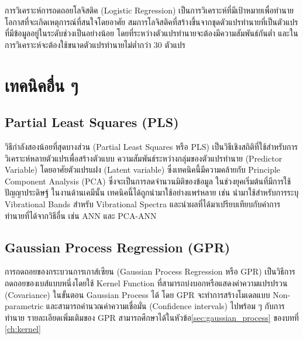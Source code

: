 การวิเคราะห์การถดถอยโลจิสติค (Logistic Regression) เป็นการวิเคราะห์ที่มีเป้าหมายเพื่อทำนายโอกาสที่จะเกิดเหตุการณ์ที่สนใจโดยอาศัย%
สมการโลจิสติคที่สร้างขึ้นจากชุดตัวแปรทำนายที่เป็นตัวแปรที่มีข้อมูลอยู่ในระดับช่วงเป็นอย่างน้อย โดยที่ระหว่างตัวแปรทำนายจะต้องมีความสัมพันธ์กันต่ำ 
และในการวิเคราะห์จะต้องใช้ขนาดตัวแปรทำนายไม่ต่ำกว่า 30 ตัวแปร

\section{เทคนิคอื่น ๆ}

\subsection{Partial Least Squares (PLS)}
\label{sec:pls}

วิธีกำลังสองน้อยที่สุดบางส่วน (Partial Least Squares หรือ PLS) เป็นวิธีเชิงสถิติที่ใช้สำหรับการวิเคราะห์หลายตัวแปรเพื่อสร้างตัวแบบ%
ความสัมพันธ์ระหว่างกลุ่มของตัวแปรทำนาย (Predictor Variable) โดยอาศัยตัวแปรแฝง (Latent variable) ซึ่งเทคนิคนี้มีความคล้ายกับ 
Principle Component Analysis (PCA) ซึ่งจะเป็นการลดจำนวนมิติของข้อมูล\autocite{wold1984} ในช่วงยุคเริ่มต้นที่มีการใช้ปัญญาประดิษฐ์%
ในงานด้านเคมีนั้น เทคนิคนี้ได้ถูกนำมาใช้อย่างแพร่หลาย เช่น นำมาใช้สำหรับการระบุ Vibrational Bands สำหรับ Vibrational Spectra 
และนำผลที่ได้มาเปรียบเทียบกับค่าการทำนายที่ได้จากวิธีอื่น เช่น ANN และ PCA-ANN

\subsection{Gaussian Process Regression (GPR)}
\label{sec:gpr}

การถดถอยของกระบวนการเกาส์เซียน (Gaussian Process Regression หรือ GPR) เป็นวิธีการถดถอยของเบส์แบบหนึ่งโดยใช้ Kernel Function 
ที่สามารถบ่งบอกหรือแสดงค่าความแปรปรวน (Covariance) ในขั้นตอน Gaussian Process ได้\autocite{rasmussen2005} โดย GPR 
จะทำการสร้างโมเดลแบบ Non-parametric และสามารถคำนวณค่าความเชื่อมั่น (Confidence intervals) ไปพร้อม ๆ กับการทำนาย 
รายละเอียดเพิ่มเติมของ GPR สามารถศึกษาได้ในหัวข้อ\ref{sec:gaussian_process} ของบทที่ \ref{ch:kernel}

